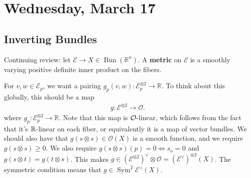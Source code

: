 \hypertarget{wednesday-march-17}{%
\section{Wednesday, March 17}\label{wednesday-march-17}}

\hypertarget{inverting-bundles}{%
\subsection{Inverting Bundles}\label{inverting-bundles}}

\begin{remark}

Continuing review: let
\(\mathcal{E} \to X \in \mathop{\mathrm{Bun}}({\mathbb{R}}^n)\). A
\textbf{metric} on \(\mathcal{E}\) is a smoothly varying positive
definite inner product on the fibers.

\begin{figure}
\centering
{}
\end{figure}

For \(v, w\in \mathcal{E}_p\), we want a pairing
\(g_p(v, w): \mathcal{E}_p^{\otimes 2} \to {\mathbb{R}}\). To think
about this globally, this should be a map
\begin{align*}
g: \mathcal{E}^{\otimes 2} \to {\mathcal{O}}
.\end{align*}
where \(g_p: \mathcal{E}_p^{\otimes 2} \to {\mathbb{R}}\). Note that
this map is \({\mathcal{O}}{\hbox{-}}\)linear, which follows from the
fact that it's \({\mathbb{R}}{\hbox{-}}\)linear on each fiber, or
equivalently it is a map of vector bundles. We should also have that
\(g(s\otimes s) \in {\mathcal{O}}(X)\) is a smooth function, and we
require \(g(s\otimes s) \geq 0\). We also require
\(g(s\otimes s)(p) = 0 \iff s_o = 0\) and
\(g(s\otimes t) = g(t\otimes s)\). This makes
\(g\in (\mathcal{E}^{\otimes 2})^\vee\otimes{\mathcal{O}}= (\mathcal{E}^\vee)^{\otimes 2}(X)\).
The symmetric condition means that
\(g\in \operatorname{Sym}^2 \mathcal{E}^\vee(X)\).

\end{remark}

